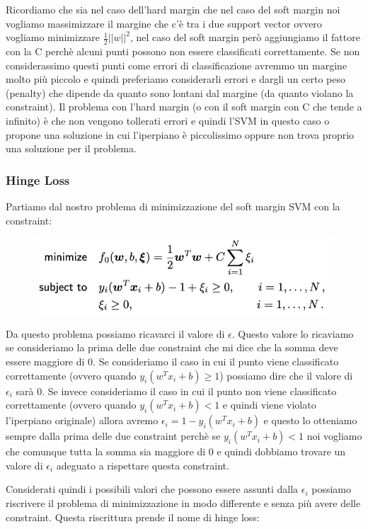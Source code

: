 \documentclass[14pt]{extreport}
\begin{document}
Ricordiamo che sia nel caso dell'hard margin che nel caso del soft margin noi vogliamo massimizzare il margine che c'è tra i due support vector ovvero
vogliamo minimizzare $\frac{1}{2}||w||^2$, nel caso del soft margin però aggiungiamo il fattore con la C perchè alcuni punti possono non essere
classificati correttamente. Se non considerassimo questi punti come errori di classificazione avremmo un margine molto più piccolo e quindi preferiamo
considerarli errori e dargli un certo peso (penalty) che dipende da quanto sono lontani dal margine (da quanto violano la constraint). Il problema con
l'hard margin (o con il soft margin con C che tende a infinito) è che non vengono tollerati errori e quindi l'SVM in questo caso o propone una
soluzione in cui l'iperpiano è piccolissimo oppure non trova proprio una soluzione per il problema.


\subsubsection{Hinge Loss}

Partiamo dal nostro problema di minimizzazione del soft margin SVM con la constraint:

\begin{figure}[H]
	\centering
	\includegraphics[width=0.7\linewidth]{327.jpeg}
\end{figure}

Da questo problema possiamo ricavarci il valore di $\epsilon$. Questo valore lo ricaviamo se consideriamo la prima delle due constraint che mi dice
che la somma deve essere maggiore di 0. Se consideriamo il caso in cui il punto viene classificato correttamente (ovvero quando $y_i(w^Tx_i+b) \geq
1$) possiamo dire che il valore di $\epsilon_i$ sarà 0. Se invece consideriamo il caso in cui il punto non viene classificato correttamente (ovvero
quando $y_i(w^Tx_i+b) < 1$ e quindi viene violato l'iperpiano originale) allora avremo $\epsilon_i = 1-y_i(w^Tx_i+b)$ e questo lo otteniamo sempre
dalla prima delle due constraint perchè se $y_i(w^Tx_i+b) < 1$ noi vogliamo che comunque tutta la somma sia maggiore di 0 e quindi dobbiamo trovare un
valore di $\epsilon_i$ adeguato a rispettare questa constraint.

Considerati quindi i possibili valori che possono essere assunti dalla $\epsilon_i$ possiamo riscrivere il problema di minimizzazione in modo
differente e senza più avere delle constraint. Questa riscrittura prende il nome di hinge loss:
\end{document}
